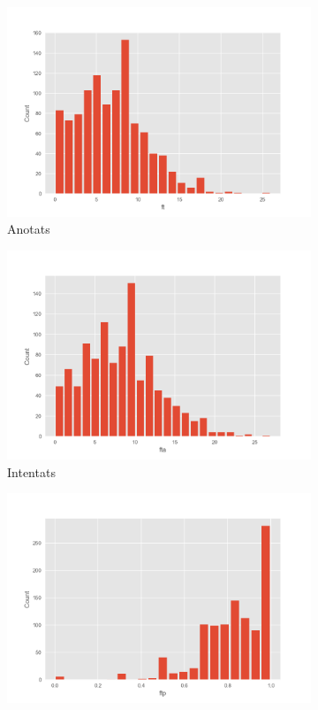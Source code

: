 \documentclass{article}
\begin{document}
\begin{figure}[!h]
	\centering
	\begin{subfigure}[b]{0.25\textwidth}
		\centering
		\includegraphics[width=\textwidth]{hist13}
		\caption*{Anotats}
		\label{fig:hist13}
	\end{subfigure}
	\hfill
	\begin{subfigure}[b]{0.25\textwidth}
		\centering
		\includegraphics[width=\textwidth]{hist14}
		\caption*{Intentats}
		\label{fig:hist14}
	\end{subfigure}
	\hfill
	\begin{subfigure}[b]{0.25\textwidth}
		\centering
		\includegraphics[width=\textwidth]{hist15}

\end{subfigure}
\end{figure}
\end{document}
